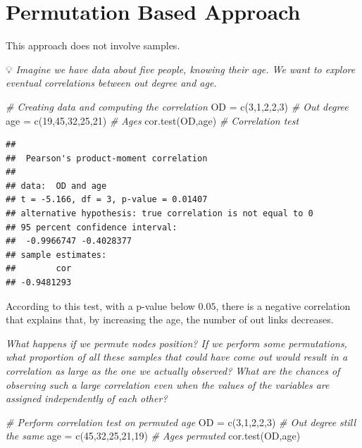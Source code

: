 \documentclass[
  notitlepage,
  onecolumn,
  openany]{book}
\newenvironment{Shaded}{\begin{snugshade}}{\end{snugshade}}
\newcommand{\CommentTok}[1]{\textcolor[rgb]{0.56,0.35,0.01}{\textit{#1}}}
\newcommand{\DecValTok}[1]{\textcolor[rgb]{0.00,0.00,0.81}{#1}}
\newcommand{\FunctionTok}[1]{\textcolor[rgb]{0.00,0.00,0.00}{#1}}
\newcommand{\NormalTok}[1]{#1}
\newcommand{\OtherTok}[1]{\textcolor[rgb]{0.56,0.35,0.01}{#1}}
\begin{document}
\hypertarget{permutation-based-approach}{%
\section{Permutation Based Approach}\label{permutation-based-approach}}

This approach does not involve samples.

💡 \emph{Imagine we have data about five people, knowing their age. We want to explore eventual correlations between out degree and age.}

\begin{Shaded}
\begin{Highlighting}[]
\CommentTok{\# Creating data and computing the correlation}
\NormalTok{OD }\OtherTok{=} \FunctionTok{c}\NormalTok{(}\DecValTok{3}\NormalTok{,}\DecValTok{1}\NormalTok{,}\DecValTok{2}\NormalTok{,}\DecValTok{2}\NormalTok{,}\DecValTok{3}\NormalTok{) }\CommentTok{\# Out degree}
\NormalTok{age }\OtherTok{=} \FunctionTok{c}\NormalTok{(}\DecValTok{19}\NormalTok{,}\DecValTok{45}\NormalTok{,}\DecValTok{32}\NormalTok{,}\DecValTok{25}\NormalTok{,}\DecValTok{21}\NormalTok{) }\CommentTok{\# Ages}
\FunctionTok{cor.test}\NormalTok{(OD,age) }\CommentTok{\# Correlation test}
\end{Highlighting}
\end{Shaded}

\begin{verbatim}
## 
##  Pearson's product-moment correlation
## 
## data:  OD and age
## t = -5.166, df = 3, p-value = 0.01407
## alternative hypothesis: true correlation is not equal to 0
## 95 percent confidence interval:
##  -0.9966747 -0.4028377
## sample estimates:
##        cor 
## -0.9481293
\end{verbatim}

According to this test, with a p-value below \(0.05\), there is a negative correlation that explains that, by increasing the age, the number of out links decreases.

\emph{What happens if we permute nodes position? If we perform some permutations, what proportion of all these samples that could have come out would result in a correlation as large as the one we actually observed? What are the chances of observing such a large correlation even when the values of the variables are assigned independently of each other?}

\begin{Shaded}
\begin{Highlighting}[]
\CommentTok{\# Perform correlation test on permuted age}
\NormalTok{OD }\OtherTok{=} \FunctionTok{c}\NormalTok{(}\DecValTok{3}\NormalTok{,}\DecValTok{1}\NormalTok{,}\DecValTok{2}\NormalTok{,}\DecValTok{2}\NormalTok{,}\DecValTok{3}\NormalTok{) }\CommentTok{\# Out degree still the same}
\NormalTok{age }\OtherTok{=} \FunctionTok{c}\NormalTok{(}\DecValTok{45}\NormalTok{,}\DecValTok{32}\NormalTok{,}\DecValTok{25}\NormalTok{,}\DecValTok{21}\NormalTok{,}\DecValTok{19}\NormalTok{) }\CommentTok{\# Ages permuted}
\FunctionTok{cor.test}\NormalTok{(OD,age)}
\end{Highlighting}
\end{Shaded}
\end{document}
